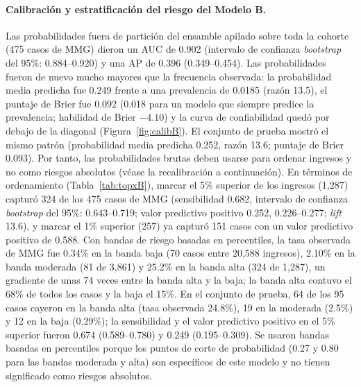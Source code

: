 \documentclass[healthcare,article,submit,pdftex,moreauthors]{Definitions/mdpi_es}
\begin{document}
\paragraph{Calibración y estratificación del riesgo del Modelo B.}
Las probabilidades fuera de partición del ensamble apilado sobre toda la cohorte (475 casos de MMG) dieron un AUC de 0.902
(intervalo de confianza \emph{bootstrap} del 95\%: 0.884--0.920) y una AP de 0.396 (0.349--0.454). Las probabilidades fueron
de nuevo mucho mayores que la frecuencia observada: la probabilidad media predicha fue 0.249 frente a una prevalencia de 0.0185
(razón 13.5), el puntaje de Brier fue 0.092 (0.018 para un modelo que siempre predice la prevalencia; habilidad de Brier $-4.10$)
y la curva de confiabilidad quedó por debajo de la diagonal (Figura~\ref{fig:calibB}). El conjunto de prueba mostró el mismo patrón (probabilidad media
predicha 0.252, razón 13.6; puntaje de Brier 0.093). Por tanto, las probabilidades brutas deben usarse para ordenar ingresos y no como riesgos absolutos (véase la recalibración a continuación).
En términos de ordenamiento (Tabla~\ref{tab:topxB}), marcar el 5\% superior de los ingresos (1{,}287) capturó 324 de los 475 casos de MMG
(sensibilidad 0.682, intervalo de confianza \emph{bootstrap} del 95\%: 0.643--0.719; valor predictivo positivo 0.252, 0.226--0.277; \emph{lift} 13.6),
y marcar el 1\% superior (257) ya capturó 151 casos con un valor predictivo positivo de 0.588. Con bandas de riesgo basadas en percentiles,
la tasa observada de MMG fue 0.34\% en la banda baja (70 casos entre 20{,}588 ingresos), 2.10\% en la banda moderada
(81 de 3{,}861) y 25.2\% en la banda alta (324 de 1{,}287), un gradiente de unas 74 veces entre la banda alta y la baja; la
banda alta contuvo el 68\% de todos los casos y la baja el 15\%. En el conjunto de prueba, 64 de los 95 casos cayeron en la banda alta (tasa observada 24.8\%),
19 en la moderada (2.5\%) y 12 en la baja (0.29\%); la sensibilidad y el valor predictivo positivo en el 5\% superior fueron 0.674 (0.589--0.780) y 0.249 (0.195--0.309).
Se usaron bandas basadas en percentiles porque los puntos de corte de probabilidad (0.27 y 0.80 para las bandas moderada y alta) son específicos de este
modelo y no tienen significado como riesgos absolutos.
\end{document}
